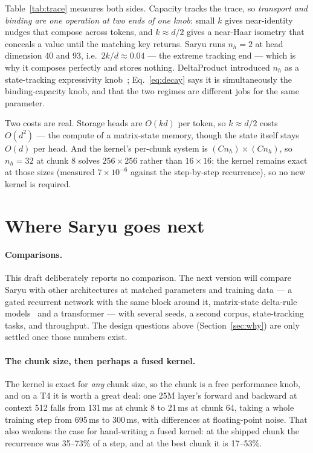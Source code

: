 \documentclass[10pt]{article}
\begin{document}
Table~\ref{tab:trace} measures both sides. Capacity tracks the trace, so \emph{transport and binding
are one operation at two ends of one knob}: small $k$ gives near-identity nudges that compose across
tokens, and $k\approx d/2$ gives a near-Haar isometry that conceals a value until the matching key
returns. Saryu runs $n_h=2$ at head dimension 40 and 93, i.e.\ $2k/d\approx0.04$ --- the extreme
tracking end --- which is why it composes perfectly and stores nothing. DeltaProduct introduced $n_h$
as a state-tracking expressivity knob~\cite{siems2025}; Eq.~\ref{eq:decay} says it is simultaneously
the binding-capacity knob, and that the two regimes are different jobs for the same parameter.

Two costs are real. Storage heads are $O(kd)$ per token, so $k\approx d/2$ costs $O(d^2)$ --- the
compute of a matrix-state memory, though the state itself stays $O(d)$ per head. And the kernel's
per-chunk system is $(Cn_h)\times(Cn_h)$, so $n_h=32$ at chunk 8 solves $256\times256$ rather than
$16\times16$; the kernel remains exact at those sizes (measured $7\times10^{-6}$ against the
step-by-step recurrence), so no new kernel is required.

\section{Where Saryu goes next}
\label{sec:next}

\paragraph{Comparisons.} This draft deliberately reports no comparison. The next version will compare
Saryu with other architectures at matched parameters and training data --- a gated recurrent network
with the same block around it, matrix-state delta-rule models~\cite{yang2024delta,yang2024gated,siems2025}
and a transformer --- with several seeds, a second corpus,
state-tracking tasks, and throughput. The design questions above (Section~\ref{sec:why}) are
only settled once those numbers exist.

\paragraph{The chunk size, then perhaps a fused kernel.} The kernel is exact for \emph{any} chunk
size, so the chunk is a free performance knob, and on a T4 it is worth a great deal: one 25M layer's
forward and backward at context 512 falls from 131\,ms at chunk 8 to 21\,ms at chunk 64, taking a
whole training step from 695\,ms to 300\,ms, with differences at floating-point noise. That also
weakens the case for hand-writing a fused kernel: at the shipped chunk the recurrence was 35--73\% of
a step, and at the best chunk it is 17--53\%.
\end{document}
